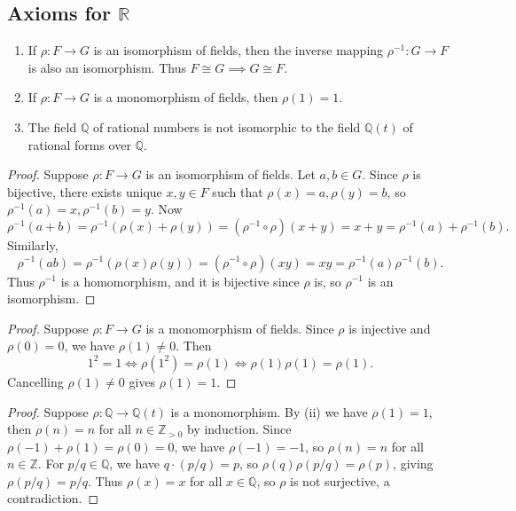 \subsection{Axioms for $\mathbb{R}$}

\begin{tcolorbox}[title=Problem 1, breakable]
    \begin{enumerate}
        \item If $\rho : F \longrightarrow G$ is an isomorphism of fields, then the inverse mapping $\rho^{-1}: G \longrightarrow F$ is also an isomorphism. Thus $F \cong G \implies G \cong F$.
        \item If $\rho : F \longrightarrow G$ is a monomorphism of fields, then $\rho(1) = 1$.
        \item The field $\mathbb{Q}$ of rational numbers is not isomorphic to the field $\mathbb{Q}(t)$ of rational forms over $\mathbb{Q}$.
    \end{enumerate}
\end{tcolorbox}

\begin{proof}
    Suppose $\rho : F \longrightarrow G$ is an isomorphism of fields.
    Let $a, b \in G$. Since $\rho$ is bijective, there exists unique $x, y \in F$ such that $\rho(x) = a, \rho(y) = b$,
        so $\rho^{-1}(a) = x, \rho^{-1}(b) = y$.
    Now 
    \[\rho^{-1}(a + b) = \rho^{-1}(\rho(x) + \rho(y)) = (\rho^{-1} \circ \rho)(x + y) = x + y = \rho^{-1}(a) + \rho^{-1}(b).\]
    Similarly,
    \[\rho^{-1}(ab) = \rho^{-1}(\rho(x)\rho(y)) = (\rho^{-1} \circ \rho)(xy) = xy = \rho^{-1}(a)\rho^{-1}(b).\]
    Thus $\rho^{-1}$ is a homomorphism, and it is bijective since $\rho$ is, so $\rho^{-1}$ is an isomorphism.
\end{proof}

\begin{proof}
    Suppose $\rho : F \longrightarrow G$ is a monomorphism of fields.
    Since $\rho$ is injective and $\rho(0) = 0$, we have $\rho(1) \neq 0$.
    Then 
    \[1^2 = 1 \iff \rho(1^2) = \rho(1) \iff \rho(1)\rho(1) = \rho(1).\]
    Cancelling $\rho(1) \neq 0$ gives $\rho(1) = 1$.
\end{proof}

\begin{proof}
    Suppose $\rho : \mathbb{Q} \longrightarrow \mathbb{Q}(t)$ is a monomorphism.
    By (ii) we have $\rho(1) = 1$, then $\rho(n) = n$ for all $n \in \mathbb{Z}_{>0}$ by induction.
    Since $\rho(-1) + \rho(1) = \rho(0) = 0$, we have $\rho(-1) = -1$, so $\rho(n) = n$ for all $n \in \mathbb{Z}$.
    For $p/q \in \mathbb{Q}$, we have $q \cdot (p/q) = p$, so $\rho(q)\rho(p/q) = \rho(p)$, giving $\rho(p/q) = p/q$.
    Thus $\rho(x) = x$ for all $x \in \mathbb{Q}$, so $\rho$ is not surjective, a contradiction.
\end{proof}


